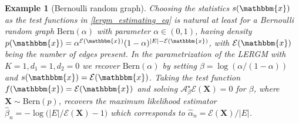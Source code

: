 \documentclass{article}
\newtheorem{Example}[Theorem]{Example}
\begin{document}
\begin{Example}[Bernoulli random graph] \label{remark_bernoulli}
Choosing the statistics $s(\mathbbm{x})$ as the test functions in \eqref{lergm_estimating_eq} is natural at least for a Bernoulli   random graph $\mathrm{Bern}(\alpha)$ with parameter $\alpha \in (0,1)$, having   density $p(\mathbbm{x}) = \alpha^{\mathcal{E}(\mathbbm{x})}(1-\alpha)^{\vert E \vert-\mathcal{E}(\mathbbm{x})}$,  with $\mathcal{E}(\mathbbm{x})$ being the number of edges present. In the parametrization of the LERGM  with $K=1, d_1 = 1, d_2=0$ we recover $\mathrm{Bern}(\alpha)$ by setting $\beta = \log(\alpha/(1-\alpha))$ and $s(\mathbbm{x})=\mathcal{E}(\mathbbm{x})$. Taking the test function $f(\mathbbm{x})=\mathcal{E}(\mathbbm{x})$ and solving $\mathcal{A}_{\beta}^{\star}\mathcal{E}(\mathbf{X})=0$ for $\beta$, where $\mathbf{X} \sim \mathrm{Bern}(p)$,  recovers  the maximum likelihood estimator $\hat{\beta}_n=-\log\big( {\vert E \vert }/{\mathcal{E}(\mathbf{X})} - 1 \big)$   
which corresponds to $ \hat{\alpha}_n=\mathcal{E}(\mathbf{X})/\vert E \vert$.
\end{Example}
\end{document}
